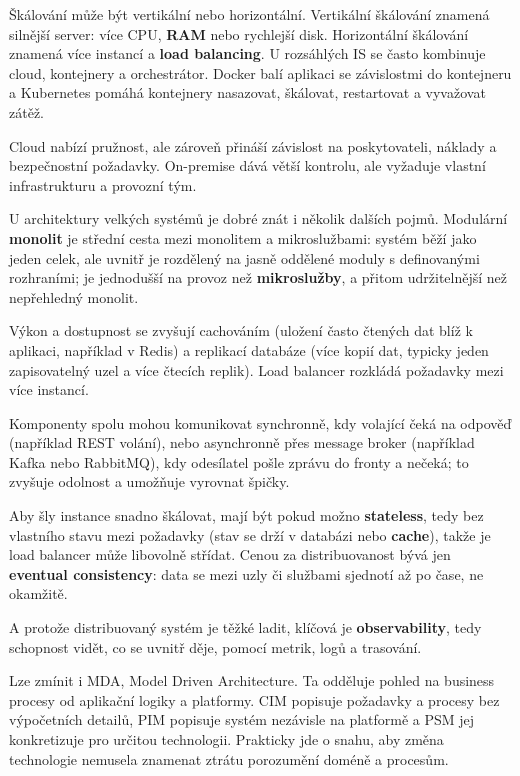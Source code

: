 Škálování může být vertikální nebo horizontální. Vertikální škálování znamená silnější server: více CPU, \textbf{RAM} nebo rychlejší disk. Horizontální škálování znamená více instancí a \textbf{load balancing}. U rozsáhlých IS se často kombinuje cloud, kontejnery a orchestrátor. Docker balí aplikaci se závislostmi do kontejneru a Kubernetes pomáhá kontejnery nasazovat, škálovat, restartovat a vyvažovat zátěž.

Cloud nabízí pružnost, ale zároveň přináší závislost na poskytovateli, náklady a bezpečnostní požadavky. On-premise dává větší kontrolu, ale vyžaduje vlastní infrastrukturu a provozní tým.

U architektury velkých systémů je dobré znát i několik dalších pojmů. Modulární \textbf{monolit} je střední cesta mezi monolitem a mikroslužbami: systém běží jako jeden celek, ale uvnitř je rozdělený na jasně oddělené moduly s definovanými rozhraními; je jednodušší na provoz než \textbf{mikroslužby}, a přitom udržitelnější než nepřehledný monolit.

Výkon a dostupnost se zvyšují cachováním (uložení často čtených dat blíž k aplikaci, například v Redis) a replikací databáze (více kopií dat, typicky jeden zapisovatelný uzel a více čtecích replik). Load balancer rozkládá požadavky mezi více instancí.

Komponenty spolu mohou komunikovat synchronně, kdy volající čeká na odpověď (například REST volání), nebo asynchronně přes message broker (například Kafka nebo RabbitMQ), kdy odesílatel pošle zprávu do fronty a nečeká; to zvyšuje odolnost a umožňuje vyrovnat špičky.

Aby šly instance snadno škálovat, mají být pokud možno \textbf{stateless}, tedy bez vlastního stavu mezi požadavky (stav se drží v databázi nebo \textbf{cache}), takže je load balancer může libovolně střídat. Cenou za distribuovanost bývá jen \textbf{eventual consistency}: data se mezi uzly či službami sjednotí až po čase, ne okamžitě.

A protože distribuovaný systém je těžké ladit, klíčová je \textbf{observability}, tedy schopnost vidět, co se uvnitř děje, pomocí metrik, logů a trasování.

Lze zmínit i MDA, Model Driven Architecture. Ta odděluje pohled na business procesy od aplikační logiky a platformy. CIM popisuje požadavky a procesy bez výpočetních detailů, PIM popisuje systém nezávisle na platformě a PSM jej konkretizuje pro určitou technologii. Prakticky jde o snahu, aby změna technologie nemusela znamenat ztrátu porozumění doméně a procesům.

